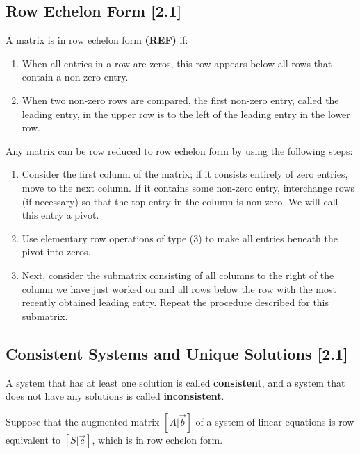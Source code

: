 \documentclass[a4paper,9pt]{extarticle}
\begin{document}
\begin{multicols*}{2}

\subsection{Row Echelon Form [2.1]}
A matrix is in row echelon form \textbf{(REF)} if:
\begin{enumerate}[label=\bfseries (\arabic*)] \itemsep0pt \parskip0pt 
    \item When all entries in a row are zeros, this row appears below all rows that contain
a non-zero entry.
    \item When two non-zero rows are compared, the first non-zero entry, called the leading entry, in the upper row is to the left of the leading entry in the lower row.
\end{enumerate}

Any matrix can be row reduced to row echelon form by using the following steps:
\begin{enumerate}[label=\bfseries (\arabic*)] \itemsep0pt \parskip0pt 
    \item Consider the first column of the matrix; if it consists entirely of zero entries, move to the next column. If it contains some non-zero entry, interchange rows (if necessary) so that the top entry in the column is non-zero. We will call this entry a pivot.
    \item Use elementary row operations of type (3) to make all entries beneath the pivot into zeros.
    \item Next, consider the submatrix consisting of all columns to the right of the column we have just worked on and all rows below the row with the most recently obtained leading entry. Repeat the procedure described for this submatrix.
\end{enumerate}



\subsection{Consistent Systems and Unique Solutions [2.1]}
A system that has at least one solution is called \textbf{consistent}, and a system that does not have any solutions is called \textbf{inconsistent}.

Suppose that the augmented matrix $[A | \vec{b}]$ of a system of linear equations is row equivalent to $[S | \vec{c}]$, which is in row echelon form.


\end{multicols*}
\end{document}
